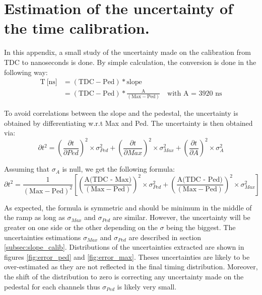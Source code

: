 \chapter{Estimation of the uncertainty of the time calibration.}
\label{appendix:calib_error}

In this appendix, a small study of the uncertainty made on the calibration from TDC to nanoseconds is done. By simple calculation, the conversion is done in the following way:
\begin{equation*}
	\begin{split}
		\text{T} \: \text{[ns]} & = ( \text{TDC} - \text{Ped} ) * \text{slope} \\
		& = ( \text{TDC} - \text{Ped} ) * \frac{\text{A}}{(\text{Max} - \text{Ped})} \quad \text{with A = 3920 ns}
	\end{split}
\end{equation*}

To avoid correlations between the slope and the pedestal, the uncertainty is obtained by differentiating w.r.t Max and Ped. The uncertainty is then obtained via:
\begin{equation*}
	\partial t^2 = \left(\frac{\partial t}{\partial Ped}\right)^2 \times \sigma_{Ped}^2 + \left(\frac{\partial t}{\partial Max}\right)^2 \times \sigma_{Max}^2 + \left(\frac{\partial t}{\partial A}\right)^2 \times \sigma_{A}^2
\end{equation*}

Assuming that $\sigma_{A}$ is null, we get the following formula:
\begin{equation*}
	\partial t^2 = \frac{1}{(\text{Max} - \text{Ped})^2} \left[ \left( \frac{\text{A(TDC - Max)}}{(\text{Max} - \text{Ped})} \right)^2 \times \sigma_{Ped}^2 + \left( \frac{\text{A(TDC - Ped)}}{(\text{Max} - \text{Ped})} \right)^2 \times \sigma_{Max}^2 \right]
\end{equation*}

As expected, the formula is symmetric and should be minimum in the middle of the ramp as long as $\sigma_{Max}$ and $\sigma_{Ped}$ are similar. However, the uncertainty will be greater on one side or the other depending on the $\sigma$ being the biggest. The uncertainties estimations $\sigma_{Max}$ and $\sigma_{Ped}$ are described in section \ref{subsec:slope_calib}. Distributions of the uncertainties extracted are shown in figures \ref{fig:error_ped} and \ref{fig:error_max}. Theses uncertainties are likely to be over-estimated as they are not reflected in the final timing distribution. Moreover, the shift of the distribution to zero is correcting any uncertainty made on the pedestal for each channels thus $\sigma_{Ped}$ is likely very small.

